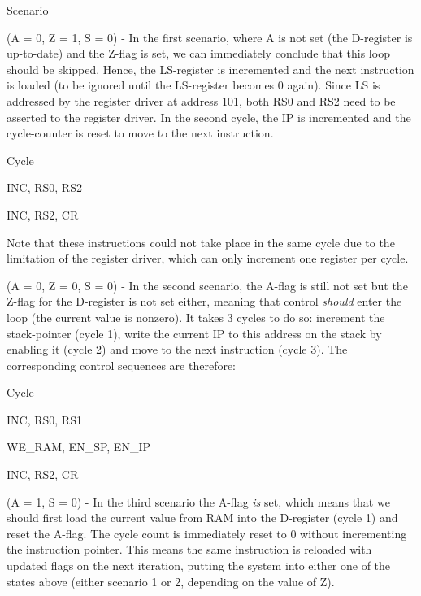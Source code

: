 \begin{labeledenum}{Scenario}
  \item (A = 0, Z = 1, S = 0) - In the first scenario, where A is not set (the D-register is up-to-date) and the Z-flag is set, we can immediately conclude that this loop should be skipped. Hence, the LS-register is incremented and the next instruction is loaded (to be ignored until the LS-register becomes 0 again). Since LS is addressed by the register driver at address 101, both RS0 and RS2 need to be asserted to the register driver. In the second cycle, the IP is incremented and the cycle-counter is reset to move to the next instruction.

    \begin{labeledenum}{Cycle}
      \item INC, RS0, RS2
      \item INC, RS2, CR
    \end{labeledenum}
    Note that these instructions could not take place in the same cycle due to the limitation of the register driver, which can only increment one register per cycle.
    

  \item (A = 0, Z = 0, S = 0) - In the second scenario, the A-flag is still not set but the Z-flag for the D-register is not set either, meaning that control \emph{should} enter the loop (the current value is nonzero). It takes 3 cycles to do so: increment the stack-pointer (cycle 1), write the current IP to this address on the stack by enabling it (cycle 2) and move to the next instruction (cycle 3). The corresponding control sequences are therefore:

    \begin{labeledenum}{Cycle}
    \item INC, RS0, RS1
    \item WE\_RAM, EN\_SP, EN\_IP
    \item INC, RS2, CR
    \end{labeledenum}

  \item (A = 1, S = 0) - In the third scenario the A-flag \emph{is} set, which means that we should first load the current value from RAM into the D-register (cycle 1) and reset the A-flag. The cycle count is immediately reset to 0 without incrementing the instruction pointer. This means the same instruction is reloaded with updated flags on the next iteration, putting the system into either one of the states above (either scenario 1 or 2, depending on the value of Z).


\end{labeledenum}
